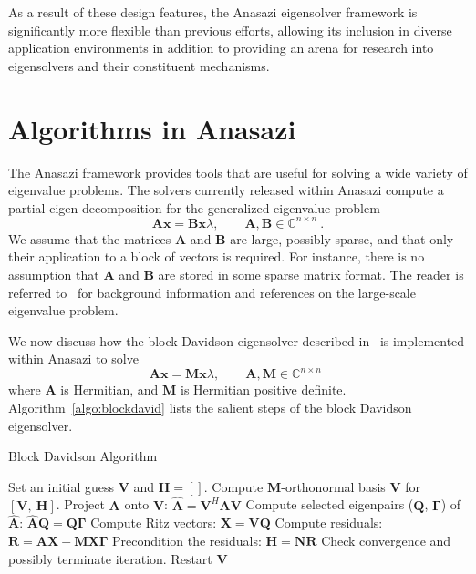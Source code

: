 \documentclass[acmtoms,acmnow]{acmtrans2m}
\begin{document}
As a result of these design features, the Anasazi eigensolver framework is significantly
more flexible than previous efforts, allowing its inclusion in diverse application
environments in addition to providing an arena for research into eigensolvers and their
constituent mechanisms. 

\section{Algorithms in Anasazi}
\label{sec:algorithm-overview}

The Anasazi framework provides tools that are useful for solving a
wide variety of eigenvalue problems. The solvers currently released
within Anasazi compute a partial eigen-decomposition for the
generalized eigenvalue problem
\begin{equation}  \label{eq:EigenproblemDefinition}
  \mathbf{A} \mathbf{x} = \mathbf{B} \mathbf{x} \lambda , \qquad
  \mathbf{A}, \mathbf{B} \in \mathbb{C}^{n\times n}\ .
\end{equation}
We assume that the matrices $\mathbf{A}$ and $\mathbf{B}$ are large,
possibly sparse, and that only their application to a block of
vectors is required. For instance, there is no assumption that
$\mathbf{A}$ and $\mathbf{B}$ are stored in some sparse matrix format. The
reader is referred to~\cite{saad:92,sore:02,stew:01book,vors:02} for
background information and references on the large-scale eigenvalue
problem.

We now discuss how the block Davidson eigensolver described
in~\cite{Arbenz:2005:ACE} is implemented within Anasazi to solve
\begin{equation}  \label{eq:EigenproblemDefinitionDavidson}
  \mathbf{A} \mathbf{x} = \mathbf{M} \mathbf{x} \lambda , \qquad
  \mathbf{A}, \mathbf{M} \in \mathbb{C}^{n\times n}\ \,
\end{equation}
where $\mathbf{A}$ is Hermitian, and $\mathbf{M}$ is Hermitian
positive definite. Algorithm~\ref{algo:blockdavid} lists the salient
steps of the block Davidson eigensolver.

\begin{algorithm}
\begin{algorithmic}[1]
\caption{Block Davidson Algorithm}
\label{algo:blockdavid}
\REQUIRE
Set an initial guess $\mathbf{V}$ and $\mathbf{H} = []$.
\REPEAT
\STATE
Compute $\mathbf{M}$-orthonormal basis $\mathbf{V}$ for
$\left[ \mathbf{V}, \ \mathbf{H} \right]$.
\STATE
Project $\mathbf{A}$ onto $\mathbf{V}$:
$\mathbf{\hat{A}} = \mathbf{V}^H \mathbf{A} \mathbf{V}$
\STATE
Compute selected eigenpairs ($\mathbf{Q}$, $\mathbf{\Gamma}$)
of $\mathbf{\hat{A}}$:
$\mathbf{\hat{A}} \mathbf{Q} = \mathbf{Q} \mathbf{\Gamma}$
\STATE
Compute Ritz vectors:
$\mathbf{X} = \mathbf{V} \mathbf{Q}$
\STATE
Compute residuals:
$\mathbf{R} = \mathbf{A} \mathbf{X} -
\mathbf{M} \mathbf{X} \mathbf{\Gamma}$
\STATE
Precondition the residuals:
$\mathbf{H} = \mathbf{N}\mathbf{R}$
\STATE
Check convergence and possibly terminate iteration.
\STATE
Restart $\mathbf{V}$
\ENDFOR
\end{algorithmic}
\end{algorithm}
\end{document}
